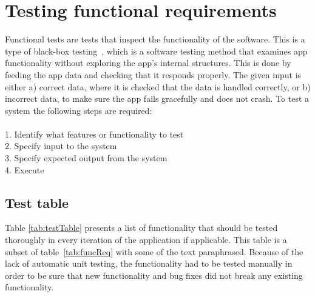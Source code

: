 \newpage
\section{Testing functional requirements}
\label{sec:funcTest}
Functional tests are tests that inspect the functionality of the software. This is a type of black-box testing~\cite{blackbox}, which is a software testing method that examines app functionality without exploring the app's internal structures. This is done by feeding the app data and checking that it responds properly. The given input is either a) correct data, where it is checked that the data is handled correctly, or b) incorrect data, to make sure the app fails gracefully and does not crash. To test a system the following steps are required:\\\\
1. Identify what features or functionality to test\\
2. Specify input to the system\\
3. Specify expected output from the system\\
4. Execute

\subsection{Test table}
Table \ref{tab:testTable} presents a list of functionality that should be tested thoroughly in every iteration of the application if applicable. This table is a subset of table~\ref{tab:funcReq} with some of the text paraphrased. Because of the lack of automatic unit testing, the functionality had to be tested manually in order to be sure that new functionality and bug fixes did not break any existing functionality.

